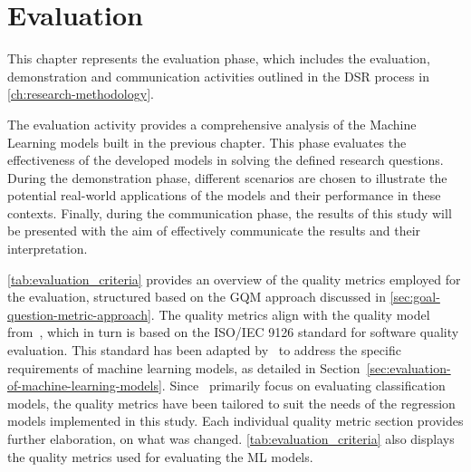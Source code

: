 \chapter{Evaluation}\label{ch:evaluation}
This chapter represents the evaluation phase, which includes the evaluation, demonstration and
communication activities outlined in the \ac{DSR} process in \cref{ch:research-methodology}.

The evaluation activity provides a comprehensive analysis of the Machine Learning models built in the
previous chapter.
This phase evaluates the effectiveness of the developed models in solving the defined research questions.
During the demonstration phase, different scenarios are chosen to illustrate the potential real-world applications of
the models and their performance in these contexts.
Finally, during the communication phase, the results of this study will be presented with the aim of effectively
communicate the results and their interpretation.

\cref{tab:evaluation_criteria} provides an overview of the quality metrics employed for the evaluation,
structured based on the \ac{GQM} approach discussed in \cref{sec:goal-question-metric-approach}.
The quality metrics align with the quality model from~\cite{siebert2022construction}, which in turn is based on
the ISO/IEC 9126 standard for software quality evaluation.
This standard has been adapted by~\cite{siebert2022construction} to address the specific requirements of machine
learning models, as detailed in Section~\ref{sec:evaluation-of-machine-learning-models}.
Since~\cite{siebert2022construction} primarily focus on evaluating classification models, the quality metrics have
been tailored to suit the needs of the regression models implemented in this study.
Each individual quality metric section provides further elaboration, on what was changed.
\cref{tab:evaluation_criteria} also displays the quality metrics used for evaluating the \ac{ML} models.

